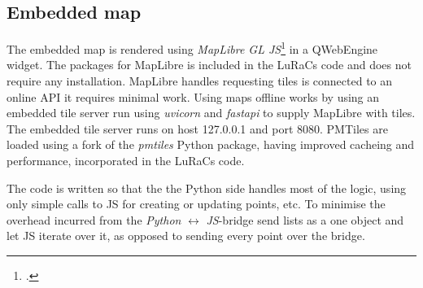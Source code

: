 

\subsection{Embedded map}
The embedded map is rendered using \textit{MapLibre GL JS}\footcite{MaplibreMaplibregljs2026} in a QWebEngine widget. The packages for MapLibre is included in the LuRaCs code and does not require any installation. MapLibre handles requesting tiles is connected to an online API it requires minimal work. Using maps offline works by using an embedded tile server run using \textit{uvicorn} and \textit{fastapi} to supply MapLibre with tiles. The embedded tile server runs on host 127.0.0.1 and port 8080. PMTiles are loaded using a fork of the \textit{pmtiles} Python package, having improved cacheing and performance, incorporated in the LuRaCs code.

The code is written so that the the Python side handles most of the logic, using only simple calls to JS for creating or updating points, etc. To minimise the overhead incurred from the \textit{Python} $\leftrightarrow$ \textit{JS}-bridge send lists as a one object and let JS iterate over it, as opposed to sending every point over the bridge.